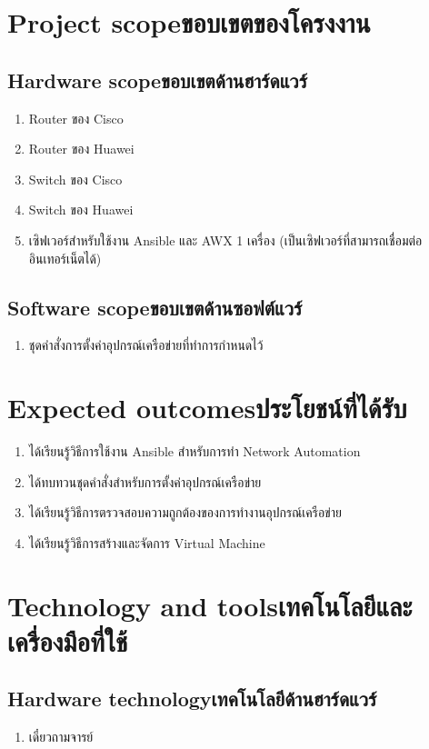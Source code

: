 \section{\ifenglish Project scope\else ขอบเขตของโครงงาน\fi}
\subsection{\ifenglish Hardware scope\else ขอบเขตด้านฮาร์ดแวร์\fi}
\begin{enumerate}
    \item {Router ของ Cisco}
    \item {Router ของ Huawei}
    \item {Switch ของ Cisco}
    \item {Switch ของ Huawei}
    \item {เซิฟเวอร์สำหรับใช้งาน Ansible และ AWX 1 เครื่อง (เป็นเซิฟเวอร์ที่สามารถเชื่อมต่ออินเทอร์เน็ตได้)}
\end{enumerate}
\subsection{\ifenglish Software scope\else ขอบเขตด้านซอฟต์แวร์\fi}
\begin{enumerate}
    \item {ชุดคำสั่งการตั้งค่าอุปกรณ์เครือข่ายที่ทำการกำหนดไว้}
\end{enumerate}
\section{\ifenglish Expected outcomes\else ประโยชน์ที่ได้รับ\fi}
\begin{enumerate}
    \item {ได้เรียนรู้วิธีการใช้งาน Ansible สำหรับการทำ Network Automation}
    \item {ได้ทบทวนชุดคำสั่งสำหรับการตั้งค่าอุปกรณ์เครือข่าย}
    \item {ได้เรียนรู้วิธีการตรวจสอบความถูกต้องของการทำงานอุปกรณ์เครือข่าย}
    \item {ได้เรียนรู้วิธีการสร้างและจัดการ Virtual Machine }
\end{enumerate}
\section{\ifenglish Technology and tools\else เทคโนโลยีและเครื่องมือที่ใช้\fi}
    
\subsection{\ifenglish Hardware technology\else เทคโนโลยีด้านฮาร์ดแวร์\fi}
\begin{enumerate}
    \item {เดี๋ยวถามจารย์}
\end{enumerate}

